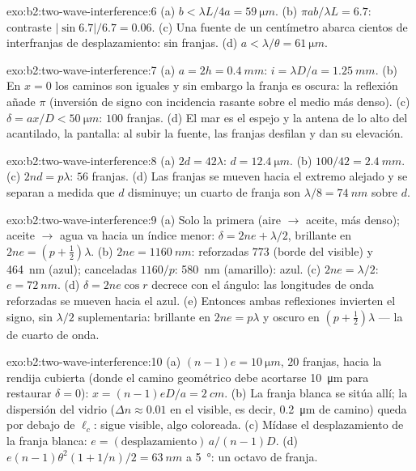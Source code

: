 \begin{solution}{exo:b2:two-wave-interference:6}
(a) $b < \lambda L/4a = \qty{59}{\micro m}$. (b) $\pi ab/\lambda L = 6.7$: contraste $|\sin6.7|/6.7
= 0.06$. (c) Una fuente de un centímetro abarca cientos de interfranjas de
desplazamiento: sin franjas. (d) $a < \lambda/\theta = \qty{61}{\micro m}$.
\end{solution}

\begin{solution}{exo:b2:two-wave-interference:7}
(a) $a = 2h = \qty{0.4}{mm}$: $i = \lambda D/a = \qty{1.25}{mm}$. (b) En $x = 0$ los caminos
son iguales y sin embargo la franja es oscura: la reflexión añade $\pi$ (inversión
de signo con incidencia rasante sobre el medio más denso). (c) $\delta = ax/D <
\qty{50}{\micro m}$: $100$ franjas. (d) El mar es el espejo y la antena de lo alto del
acantilado, la pantalla: al subir la fuente, las franjas desfilan y
dan su elevación.
\end{solution}

\begin{solution}{exo:b2:two-wave-interference:8}
(a) $2d = 42\lambda$: $d = \qty{12.4}{\micro m}$. (b) $100/42 = \qty{2.4}{mm}$. (c) $2nd = p\lambda$:
$56$ franjas. (d) Las franjas se mueven hacia el extremo alejado y se separan a medida que $d$
disminuye; un cuarto de franja son $\lambda/8 = \qty{74}{nm}$ sobre $d$.
\end{solution}

\begin{solution}{exo:b2:two-wave-interference:9}
(a) Solo la primera (aire $\to$ aceite, más denso); aceite $\to$ agua va hacia un índice
menor: $\delta = 2ne + \lambda/2$, brillante en $2ne = (p + \tfrac12)\lambda$. (b) $2ne =
\qty{1160}{nm}$: reforzadas $773$ (borde del visible) y \qty{464}{nm} (azul);
canceladas $1160/p$: \qty{580}{nm} (amarillo): azul. (c) $2ne = \lambda/2$: $e = \qty{72}{nm}$.
(d) $\delta = 2ne\cos r$ decrece con el ángulo: las longitudes de onda reforzadas
se mueven hacia el azul. (e) Entonces ambas reflexiones invierten el signo, sin
$\lambda/2$ suplementaria: brillante en $2ne = p\lambda$ y oscuro en $(p + \tfrac12)\lambda$ --- la
 de cuarto de onda.
\end{solution}

\begin{solution}{exo:b2:two-wave-interference:10}
(a) $(n - 1)e = \qty{10}{\micro m}$, $20$ franjas, hacia la rendija cubierta (donde
el camino geométrico debe acortarse \qty{10}{\micro m} para restaurar $\delta = 0$):
$x = (n - 1)eD/a = \qty{2}{cm}$. (b) La franja blanca se sitúa allí; la
dispersión del vidrio ($\Delta n \approx 0.01$ en el visible, es decir, \qty{0.2}{\micro m} de camino)
queda por debajo de $\ell_c$: sigue visible, algo coloreada. (c) Mídase el
desplazamiento de la franja blanca: $e = (\text{desplazamiento})\,a/(n - 1)D$. (d) $e(n - 1)\theta^2
(1 + 1/n)/2 = \qty{63}{nm}$ a \qty{5}{\degree}: un octavo de franja.
\end{solution}

